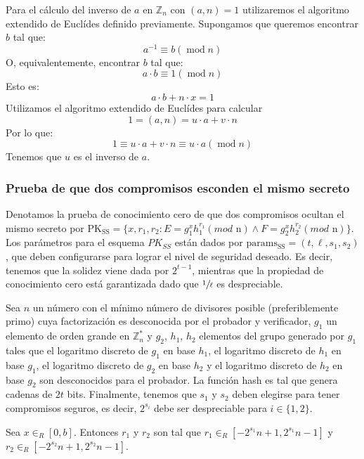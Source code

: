 \begin{proposition}
Para el cálculo del inverso de $a$ en $\mathbb{Z}_{n}$ con $(a, n) = 1$ utilizaremos el algoritmo extendido de Euclídes definido previamente. Supongamos que queremos encontrar $b$ tal que:
$$a^{-1} \equiv b (\operatorname{mod} n)$$
O, equivalentemente, encontrar $b$ tal que:
$$a \cdot b \equiv 1 (\operatorname{mod} n)$$
Esto es:
$$a \cdot b + n \cdot x = 1$$
Utilizamos el algoritmo extendido de Euclídes para calcular 
$$1 = (a, n) = u \cdot a + v \cdot n$$
Por lo que:
$$1 \equiv u \cdot a + v \cdot n \equiv u \cdot a (\operatorname{mod} n)$$
Tenemos que $u$ es el inverso de $a$.
\end{proposition}

\subsubsection{Prueba de que dos compromisos esconden el mismo secreto} \label{proof:ss}

Denotamos la prueba de conocimiento cero de que dos compromisos ocultan el mismo secreto por $\operatorname{PK_{SS}} = \{x, r_{1}, r_{2}: E = g_{1}^{x}h_{1}^{r_{1}} (mod \text{ n}) \wedge F = g_{2}^{x}h_{2}^{r_{2}} (mod \text{ n})\}$. Los parámetros para el esquema $PK_{SS}$ están dados por $\operatorname{params_{SS}} = (t, \ell, s_{1}, s_{2})$, que deben configurarse para lograr el nivel de seguridad deseado. Es decir, tenemos que la solidez viene dada por $2^{t-1}$, mientras que la propiedad de conocimiento cero está garantizada dado que $\sfrac{1}{\ell}$ es despreciable.

Sea $n$ un número con el mínimo número de divisores posible (preferiblemente primo) cuya factorización es desconocida por el probador y verificador, $g_{1}$ un elemento de orden grande en $\mathbb{Z}^{*}_{n}$ y $g_{2}$, $h_{1}$, $h_{2}$ elementos del grupo generado por $g_{1}$ tales que el logaritmo discreto de $g_{1}$ en base $h_{1}$, el logaritmo discreto de $h_{1}$ en base $g_{1}$, el logaritmo discreto de $g_{2}$ en base $h_{2}$ y el logaritmo discreto de $h_{2}$ en base $g_{2}$ son desconocidos para el probador. La función hash es tal que genera cadenas de $2t$ bits. Finalmente, tenemos que $s_{1}$ y $s_{2}$ deben elegirse para tener compromisos seguros, es decir, $2^{s_{i}}$ debe ser despreciable para $i \in \{1, 2\}$.

Sea $x \in_{R} [0, b]$. Entonces $r_{1}$ y $r_{2}$ son tal que $r_{1} \in_{R} [-2^{s_{1}}n + 1, 2^{s_{1}}n-1]$ y $r_{2} \in_{R} [-2^{s_{2}}n + 1, 2^{s_{2}}n-1]$.

